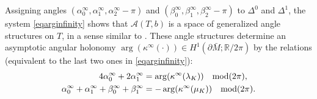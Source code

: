\documentclass[11pt]{amsart}
\newcommand{\mr}{\mathbb{R}}
\begin{document}
{Assigning angles $(\alpha_0^\infty,\alpha_1^\infty,\alpha_2^\infty - \pi)$ and $(\beta_0^\infty,\beta_1^\infty,\beta_2^\infty-\pi)$ to $\Delta^0$ and $\Delta^1$, the system \eqref{eqarginfinity} shows that $\mathcal{A}(T,b)$ is a space of generalized angle structures on $T$, in a sense similar to \cite{LT}. These angle structures determine an asymptotic angular holonomy $\arg(\kappa^\infty(\cdot )) \in H^1(\partial \bar M;\mr/2\pi)$ by the relations (equivalent to the last two ones in \eqref{eqarginfinity}):
\begin{align}
4\alpha_0^\infty+2\alpha_1^\infty & = \arg(\kappa^\infty(\lambda_K)) \quad {\rm mod}(2\pi ),\label{asycurve}\\
\alpha_0^\infty+\alpha_1^\infty+\beta_0^\infty+\beta_1^\infty & =  -\arg(\kappa^\infty(\mu_K))  \quad {\rm mod}(2\pi ).\label{asycurvemu}
\end{align}

}
\end{document}
